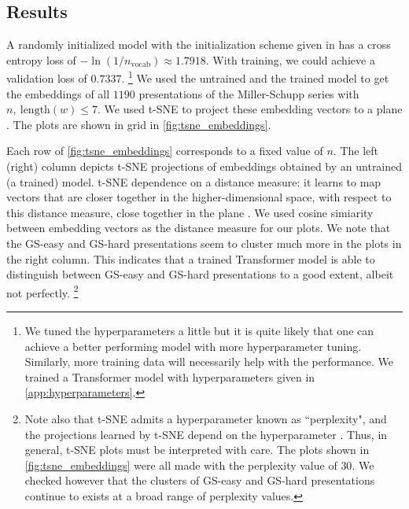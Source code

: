 \subsection{Results\label{sec:transformer_results}}
A randomly initialized model with the initialization scheme given in \cite{Radford2019LanguageMA} has a cross entropy loss of 
$-\ln (1/n_{\text{vocab}}) \approx  1.7918$.
With training, we could achieve a validation loss of $0.7337$.
\footnote{We tuned the hyperparameters a little but it is quite likely that one can achieve a better performing model with more hyperparameter tuning. Similarly, more training data will necessarily help with the performance. We trained a Transformer model with hyperparameters given in  \autoref{app:hyperparameters}.}
We used the untrained and the trained model to get the embeddings of all $1190$ presentations of the Miller-Schupp series with $n, \ \text{length}(w) \leq 7$. 
We used t-SNE to project these embedding vectors to a plane \cite{JMLR:v9:vandermaaten08a}. The plots are shown in grid in \autoref{fig:tsne_embeddings}.
\newline 


Each row of \autoref{fig:tsne_embeddings} corresponds to a fixed value of $n$. The left (right) column depicts t-SNE projections of embeddings obtained by an untrained (a trained) model. t-SNE dependence on a distance measure: it learns to map vectors that are closer together in the higher-dimensional space, with respect to this distance measure, close together in the plane \cite{JMLR:v9:vandermaaten08a}. We used cosine simiarity between embedding vectors as the distance measure for our plots. 
We note that the GS-easy and GS-hard presentations seem to cluster much more in the plots in the right column. This indicates that a trained Transformer model is able to distinguish between GS-easy and GS-hard presentations to a good extent, albeit not perfectly. 
\footnote{Note also that t-SNE admits a hyperparameter known as ``perplexity", and the projections learned by t-SNE depend on the hyperparameter \cite{wattenberg2016how}. Thus, in general, t-SNE plots must be interpreted with care. The plots shown in \autoref{fig:tsne_embeddings} were all made with the perplexity value of $30$. We checked however that the clusters of GS-easy and GS-hard presentations  continue to exists at a broad range of perplexity values.}
\newline 

